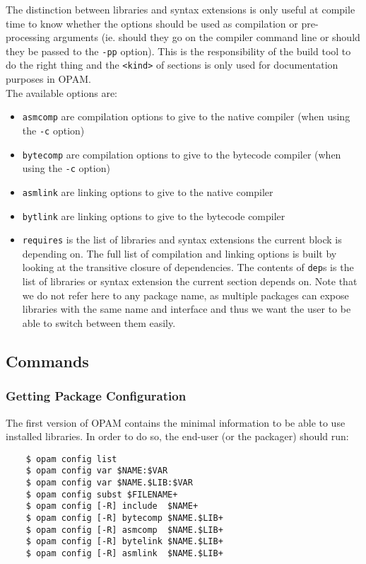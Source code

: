 \documentclass[a4paper,11pt]{article}
\begin{document}
The distinction between libraries and syntax extensions is only useful
at compile time to know whether the options should be used as
compilation or pre-processing arguments (ie. should they go on the
compiler command line or should they be passed to the {\tt -pp}
option). This is the responsibility of the build tool to do the right
thing and the {\tt <kind>} of sections is only used for documentation
purposes in OPAM. \\

The available options are:

\begin{itemize}
\item {\tt asmcomp} are compilation options to give to the native
  compiler (when using the {\tt -c} option)
\item {\tt bytecomp} are compilation options to give to the bytecode
  compiler (when using the {\tt -c} option)
\item {\tt asmlink} are linking options to give to the native compiler
\item {\tt bytlink} are linking options to give to the bytecode
  compiler
\item {\tt requires} is the list of libraries and syntax extensions
  the current block is depending on. The full list of compilation
  and linking options is built by looking at the transitive closure of
  dependencies. The contents of {\tt dep}s is the list of libraries or
  syntax extension the current section depends on. Note that we do not
  refer here to any package name, as multiple packages can expose libraries
  with the same name and interface and thus we want the user to be able
  to switch between them easily.
\end{itemize}

\subsection{Commands}

\subsubsection{Getting Package Configuration}

The first version of OPAM contains the minimal information to be able
to use installed libraries. In order to do so, the end-user (or the
packager) should run:

\begin{verbatim}
    $ opam config list
    $ opam config var $NAME:$VAR
    $ opam config var $NAME.$LIB:$VAR
    $ opam config subst $FILENAME+
    $ opam config [-R] include  $NAME+
    $ opam config [-R] bytecomp $NAME.$LIB+
    $ opam config [-R] asmcomp  $NAME.$LIB+
    $ opam config [-R] bytelink $NAME.$LIB+
    $ opam config [-R] asmlink  $NAME.$LIB+
\end{verbatim}
\end{document}
